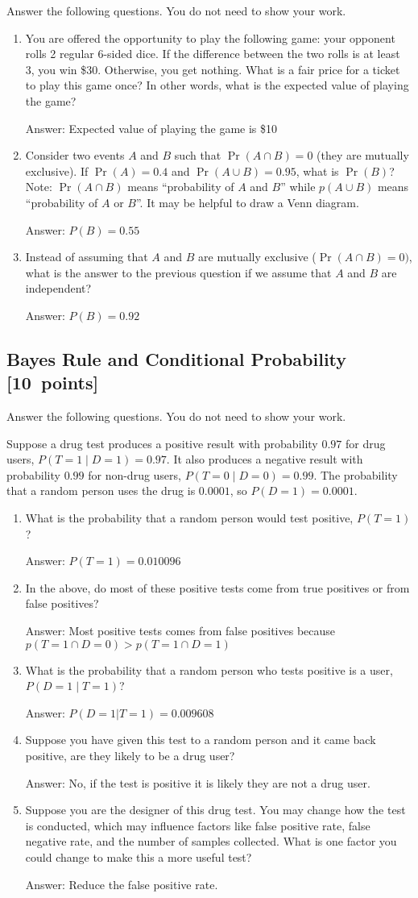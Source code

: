 \documentclass{article}
\newcommand{\blu}[1]{{\textcolor{blu}{#1}}}
\newcommand{\gre}[1]{\textcolor{gre}{#1}}
\newcommand\ans[1]{\par\gre{Answer: #1}}
\let\ask\blu
\newcommand\pts[1]{\textcolor{pointscolour}{[#1~points]}}
\begin{document}
  \ask{Answer the following questions.} You do not need to show your work.

  \begin{enumerate}
  \item You are offered the opportunity to play the following game: your opponent rolls 2 regular 6-sided dice. If the difference between the two rolls is at least 3, you win \$30. Otherwise, you get nothing. What is a fair price for a ticket to play this game once? In other words, what is the expected value of playing the game?
  \ans{Expected value of playing the game is \$10}
  \item Consider two events $A$ and $B$ such that $\Pr(A \cap B)=0$ (they are mutually exclusive). If $\Pr(A) = 0.4$ and $\Pr(A \cup B) = 0.95$, what is $\Pr(B)$? Note: $\Pr(A \cap B)$ means
  ``probability of $A$ and $B$'' while $p(A \cup B)$ means ``probability of $A$ or $B$''. It may be helpful to draw a Venn diagram.
  \ans{$P(B) = 0.55$}
  \item Instead of assuming that $A$ and $B$ are mutually exclusive ($\Pr(A \cap B) = 0)$, what is the answer to the previous question if we assume that $A$ and $B$ are independent?
  \ans{$P(B) = 0.92$}

  \end{enumerate}
  \newpage
  \subsection{Bayes Rule and Conditional Probability \pts{10}}

  \ask{Answer the following questions.} You do not need to show your work.

  Suppose a drug test produces a positive result with probability $0.97$ for drug users, $P(T=1 \mid D=1)=0.97$. It also produces a negative result with probability $0.99$ for non-drug users, $P(T=0 \mid D=0)=0.99$. The probability that a random person uses the drug is $0.0001$, so $P(D=1)=0.0001$.

  \begin{enumerate}
  \item What is the probability that a random person would test positive, $P(T=1)$?
  \ans{$P(T=1) = 0.010096$}
  \item In the above, do most of these positive tests come from true positives or from false positives?
  \ans{Most positive tests comes from false positives because $p(T=1 \cap D=0) > p(T=1 \cap D=1)$}
  \item What is the probability that a random person who tests positive is a user, $P(D=1 \mid T=1)$?
  \ans{$P(D=1|T=1) = 0.009608$}
  \item Suppose you have given this test to a random person and it came back positive, are they likely to be a drug user?
  \ans{No, if the test is positive it is likely they are not a drug user.}
  \item Suppose you are the designer of this drug test. You may change how the test is conducted, which may influence factors like false positive rate, false negative rate, and the number of samples collected. What is one factor you could change to make this a more useful test?
  \ans{Reduce the false positive rate.}
  \end{enumerate}
\end{document}
